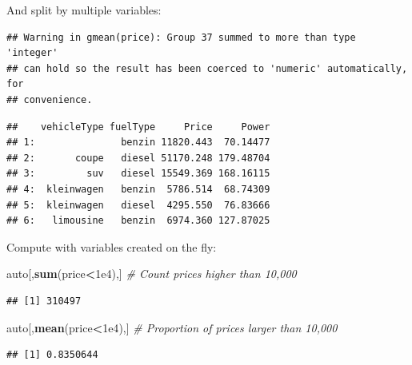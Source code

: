 \documentclass[]{book}
\newenvironment{Shaded}{\begin{snugshade}}{\end{snugshade}}
\newcommand{\KeywordTok}[1]{\textcolor[rgb]{0.13,0.29,0.53}{\textbf{#1}}}
\newcommand{\DataTypeTok}[1]{\textcolor[rgb]{0.13,0.29,0.53}{#1}}
\newcommand{\FloatTok}[1]{\textcolor[rgb]{0.00,0.00,0.81}{#1}}
\newcommand{\StringTok}[1]{\textcolor[rgb]{0.31,0.60,0.02}{#1}}
\newcommand{\CommentTok}[1]{\textcolor[rgb]{0.56,0.35,0.01}{\textit{#1}}}
\newcommand{\OperatorTok}[1]{\textcolor[rgb]{0.81,0.36,0.00}{\textbf{#1}}}
\newcommand{\NormalTok}[1]{#1}
\theoremstyle{definition}
\theoremstyle{definition}
\theoremstyle{definition}
\theoremstyle{remark}
\begin{document}
And split by multiple variables:

\begin{Shaded}
\end{Shaded}

\begin{verbatim}
## Warning in gmean(price): Group 37 summed to more than type 'integer'
## can hold so the result has been coerced to 'numeric' automatically, for
## convenience.
\end{verbatim}

\begin{verbatim}
##    vehicleType fuelType     Price     Power
## 1:               benzin 11820.443  70.14477
## 2:       coupe   diesel 51170.248 179.48704
## 3:         suv   diesel 15549.369 168.16115
## 4:  kleinwagen   benzin  5786.514  68.74309
## 5:  kleinwagen   diesel  4295.550  76.83666
## 6:   limousine   benzin  6974.360 127.87025
\end{verbatim}

Compute with variables created on the fly:

\begin{Shaded}
\begin{Highlighting}[]
\NormalTok{auto[,}\KeywordTok{sum}\NormalTok{(price}\OperatorTok{<}\FloatTok{1e4}\NormalTok{),] }\CommentTok{# Count prices higher than 10,000}
\end{Highlighting}
\end{Shaded}

\begin{verbatim}
## [1] 310497
\end{verbatim}

\begin{Shaded}
\begin{Highlighting}[]
\NormalTok{auto[,}\KeywordTok{mean}\NormalTok{(price}\OperatorTok{<}\FloatTok{1e4}\NormalTok{),] }\CommentTok{# Proportion of prices larger than 10,000}
\end{Highlighting}
\end{Shaded}

\begin{verbatim}
## [1] 0.8350644
\end{verbatim}
\end{document}
